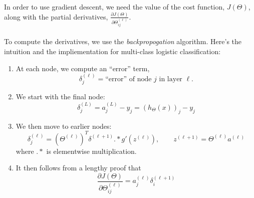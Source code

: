 \documentclass[12pt]{article}
\begin{document}
In order to use gradient descent, we need the value of the
cost function, $J(\Theta)$, along with the partial derivatives,
$\frac{\partial J(\Theta)}{\partial \Theta^{(\ell)}_{ij}}$.
\\
\\
To compute the derivatives, we use the \emph{backpropogation}
algorithm. Here's the intuition and the impliementation for
multi-class logistic classification:
\begin{enumerate}
   \item At each node, we compute an ``error'' term, 
      \[ \delta^{(\ell)}_j = \text{``error'' of node $j$ in layer
	 $\ell$.} \]
   \item We start with the final node:
      \[ \delta_j^{(L)} = a_j^{(L)} - y_j  
	 = \left(h_\Theta(x)\right)_j - y_j \]
   \item We then move to earlier nodes:
      \[ \delta^{(\ell)}_j = \left(\Theta^{(\ell)}\right)^T
      \delta^{(\ell+1)} .* g'\left(z^{(\ell)}\right), \qquad 
      z^{(\ell+1)} = \Theta^{(\ell)} a^{(\ell)} \]
      where $.*$ is elementwise multiplication.
   \item It then follows from a lengthy proof that
      \[ \frac{\partial J(\Theta)}{\partial \Theta^{(\ell)}_{ij}}
	 = a_j^{(\ell)} \delta_i^{(\ell+1)}  \]


\end{enumerate}





\end{document}
